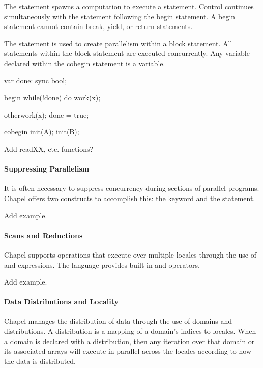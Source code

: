 The  statement spawns a computation to execute a
statement. Control continues simultaneously with the statement following
the begin statement.  A begin statement cannot contain break,
yield, or return statements.  

The  statement is used to create parallelism within
a block statement.  All statements within the block statement
are executed concurrently.  Any variable declared within the cobegin
statement is a  variable.

\begin{example}
\begin{chapel}
var done: sync bool;
 
begin 
  while(!done) do work(x);

otherwork(x);
done = true;

cobegin {
  init(A);
  init(B);
}
\end{chapel}
\end{example}

\begin{TODO}
Add readXX, etc. functions?
\end{TODO}

\paragraph{Suppressing Parallelism}
It is often necessary to suppress concurrency during sections of
parallel programs.  Chapel offers two constructs to accomplish this:
the  keyword and the  statement.

\begin{TODO}
Add example.
\end{TODO}

\paragraph{Scans and Reductions}
Chapel supports operations that execute over multiple locales through
the use of  and  expressions.  The language
provides built-in  and  operators. 

\begin{TODO}
Add example.
\end{TODO}

\paragraph{Data Distributions and Locality}
Chapel manages the distribution of data through the use of domains
and distributions.  A distribution is a mapping of a domain's indices to 
locales.  When a domain is declared with a distribution, then any iteration
over that domain or its associated arrays will execute in parallel across the 
locales according to how the data is distributed.

